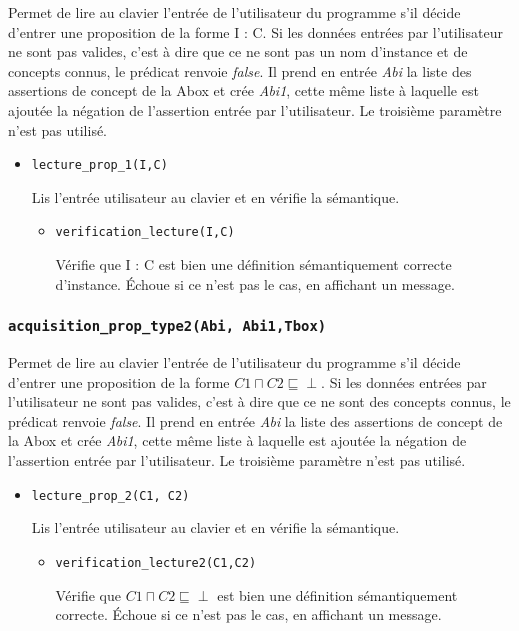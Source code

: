 \documentclass{article}
\newcommand{\code}[1]{\colorbox{light-gray}{\texttt{#1}}}
\begin{document}
Permet de lire au clavier l'entrée de l'utilisateur du programme s'il décide d'entrer une proposition de la forme I : C. Si les données entrées par l'utilisateur ne sont pas valides, c'est à dire que ce ne sont pas un nom d'instance et de concepts connus, le prédicat renvoie \textit{false}. Il prend en entrée \textit{Abi} la liste des assertions de concept de la Abox et crée \textit{Abi1}, cette même liste à laquelle est ajoutée la négation de l'assertion entrée par l'utilisateur. Le troisième paramètre n'est pas utilisé. 

\begin{itemize}

    \item \code{lecture\_prop\_1(I,C)}

    Lis l'entrée utilisateur au clavier et en vérifie la sémantique.
    
    \begin{itemize}
        \item \code{verification\_lecture(I,C)}

        Vérifie que I : C est bien une définition sémantiquement correcte d'instance. Échoue si ce n'est pas le cas, en affichant un message. 
    \end{itemize}
\end{itemize}

\subsubsection{\code{acquisition\_prop\_type2(Abi, Abi1,Tbox)}}

Permet de lire au clavier l'entrée de l'utilisateur du programme s'il décide d'entrer une proposition de la forme $C1 \sqcap C2 \sqsubseteq \perp$. Si les données entrées par l'utilisateur ne sont pas valides, c'est à dire que ce ne sont des concepts connus, le prédicat renvoie \textit{false}. Il prend en entrée \textit{Abi} la liste des assertions de concept de la Abox et crée \textit{Abi1}, cette même liste à laquelle est ajoutée la négation de l'assertion entrée par l'utilisateur. Le troisième paramètre n'est pas utilisé. 

\begin{itemize}

    \item \code{lecture\_prop\_2(C1, C2)}

    Lis l'entrée utilisateur au clavier et en vérifie la sémantique.
    
    \begin{itemize}
        \item \code{verification\_lecture2(C1,C2)}

        Vérifie que $C1 \sqcap C2 \sqsubseteq \perp$ est bien une définition sémantiquement correcte. Échoue si ce n'est pas le cas, en affichant un message. 
    \end{itemize}
\end{itemize}
\end{document}

